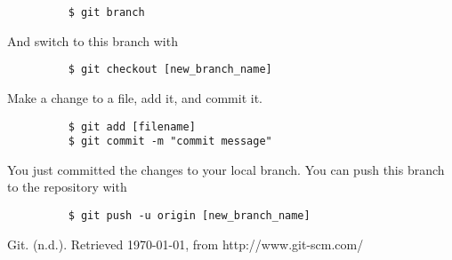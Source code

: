 \documentclass[11pt]{report}
\begin{document}
\begin{figure}[H]
  \begin{lstlisting}
    $ git branch
  \end{lstlisting}
\end{figure}

And switch to this branch with

\begin{figure}[H]
  \begin{lstlisting}
    $ git checkout [new_branch_name]
  \end{lstlisting}
\end{figure}

Make a change to a file, add it, and commit it.

\begin{figure}[H]
  \begin{lstlisting}
    $ git add [filename]
    $ git commit -m "commit message"
    \end{lstlisting}
\end{figure}

You just committed the changes to your local branch.  You can push
this branch to the repository with

\begin{figure}[H]
  \begin{lstlisting}
    $ git push -u origin [new_branch_name]
  \end{lstlisting}
\end{figure}

\begin{thebibliography}{9}

    Git. (n.d.). Retrieved \today, from http://www.git-scm.com/

\end{thebibliography}
\end{document}
